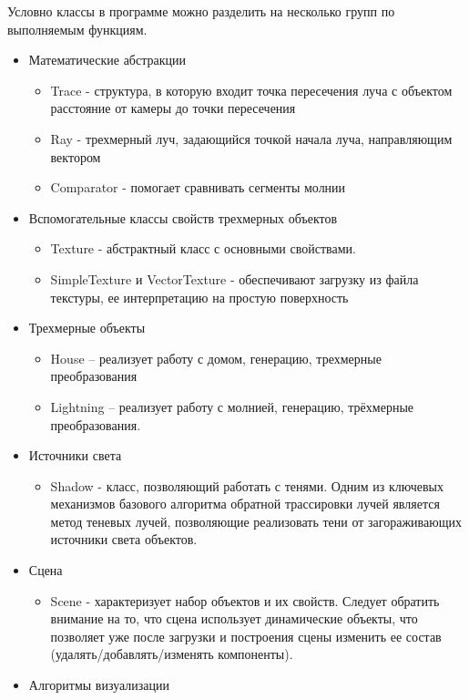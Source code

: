 Условно классы в программе можно разделить на несколько групп по выполняемым функциям.

\begin{itemize}
	\item Математические абстракции
	\begin{itemize}
		\item Trace - структура, в которую входит точка пересечения луча с объектом расстояние от камеры до точки пересечения
		\item Ray - трехмерный луч, задающийся точкой начала луча, направляющим вектором
		\item Comparator - помогает сравнивать сегменты молнии
	\end{itemize}
	\item Вспомогательные классы свойств трехмерных объектов
	\begin{itemize}
		\item Texture - абстрактный класс с основными свойствами.
		\item SimpleTexture и VectorTexture - обеспечивают загрузку из файла текстуры, ее интерпретацию на простую поверхность
	\end{itemize}
	\item Трехмерные объекты
	\begin{itemize}
		\item House – реализует работу с домом, генерацию, трехмерные преобразования
		\item Lightning – реализует работу с молнией, генерацию, трёхмерные преобразования.
	\end{itemize}
	\item Источники света
	\begin{itemize}
		\item Shadow - класс, позволяющий работать с тенями. Одним из ключевых механизмов базового алгоритма обратной трассировки лучей является метод теневых лучей, позволяющие реализовать тени от загораживающих источники света объектов.
	\end{itemize}
	\item Сцена
	\begin{itemize}
		\item Scene - характеризует набор объектов и их свойств. Следует обратить внимание на то, что сцена использует динамические объекты, что позволяет уже после загрузки и построения сцены изменить ее состав (удалять/добавлять/изменять компоненты).
	\end{itemize}
	\item Алгоритмы визуализации

\end{itemize}
